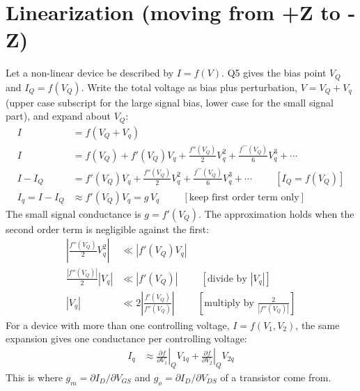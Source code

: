\section{Linearization (moving from +Z to -Z)}\label{sec:analysis_linearization}
Let a non-linear device be described by \(I = f(V)\). Q5 gives the bias
point \(V_Q\) and \(I_Q = f(V_Q)\). Write the total voltage as bias plus
perturbation, \(V = V_Q + V_q\) (upper case subscript for the large signal
bias, lower case for the small signal part), and expand about \(V_Q\):
\begin{align*}
  I &= f(V_Q + V_q) \\
  I &= f(V_Q) + f'(V_Q) V_q + \frac{f''(V_Q)}{2} V_q^2 + \frac{f^{\prime\prime\prime}(V_Q)}{6} V_q^3 + \cdots \\
  I - I_Q &= f'(V_Q) V_q + \frac{f''(V_Q)}{2} V_q^2 + \frac{f^{\prime\prime\prime}(V_Q)}{6} V_q^3 + \cdots \hspace{1cm} [I_Q = f(V_Q)] \\
  I_q = I - I_Q &\approx f'(V_Q) V_q = g\, V_q \hspace{1cm} [\text{keep first order term only}]
\end{align*}
The small signal conductance is \(g = f'(V_Q)\). The approximation holds
when the second order term is negligible against the first:
\begin{align*}
  \left|\frac{f''(V_Q)}{2} V_q^2\right| &\ll \left| f'(V_Q) V_q \right| \\
  \frac{|f''(V_Q)|}{2} |V_q| &\ll |f'(V_Q)| \hspace{1cm} [\text{divide by } |V_q|] \\
  |V_q| &\ll 2 \left| \frac{f'(V_Q)}{f''(V_Q)} \right| \hspace{1cm} [\text{multiply by } \tfrac{2}{|f''(V_Q)|}]
\end{align*}
For a device with more than one controlling voltage, \(I = f(V_1, V_2)\),
the same expansion gives one conductance per controlling voltage:
\begin{align*}
  I_q &\approx \left.\frac{\partial f}{\partial V_1}\right|_{Q} V_{1q}
             + \left.\frac{\partial f}{\partial V_2}\right|_{Q} V_{2q}
\end{align*}
This is where \(g_m = \partial I_D/\partial V_{GS}\) and
\(g_o = \partial I_D/\partial V_{DS}\) of a transistor come from.

